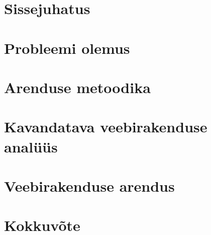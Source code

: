 \chapter{Sissejuhatus}\label{chapter:introduction}


\chapter{Probleemi olemus}\label{chapter:problem_statement}


\chapter{Arenduse metoodika}\label{chapter:metodology}


\chapter{Kavandatava veebirakenduse analüüs}\label{chapter:analysis}


\chapter{Veebirakenduse arendus}\label{chapter:development}



\chapter{Kokkuvõte}\label{chapter:summary} 

